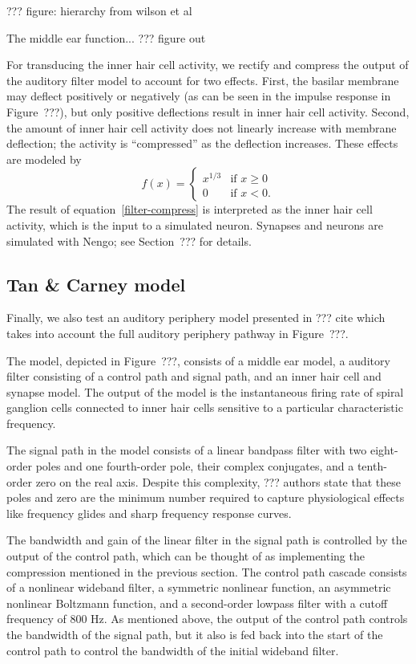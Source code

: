 ??? figure: hierarchy from wilson et al

The middle ear function...
??? figure out

For transducing the inner hair cell activity,
we rectify and compress the output
of the auditory filter model
to account for two effects.
First, the basilar membrane may deflect
positively or negatively
(as can be seen in the impulse response
in Figure~???),
but only positive deflections result in
inner hair cell activity.
Second, the amount of inner hair cell activity
does not linearly increase with
membrane deflection;
the activity is ``compressed''
as the deflection increases.
These effects are modeled by
\begin{equation} \label{filter-compress}
  f(x) =
  \begin{cases}
    x^{1 / 3} &\text{if } x \ge 0 \\
    0 &\text{if } x < 0.
  \end{cases}
\end{equation}
The result of equation~\eqref{filter-compress}
is interpreted as the inner hair cell activity,
which is the input to a simulated neuron.
Synapses and neurons are simulated with Nengo;
see Section~??? for details.

\subsection{Tan \& Carney model}

Finally, we also test
an auditory periphery model
presented in ??? cite
which takes into account
the full auditory periphery pathway
in Figure~???.

The model, depicted in Figure~???,
consists of a middle ear model,
a auditory filter consisting
of a control path and signal path,
and an inner hair cell
and synapse model.
The output of the model
is the instantaneous firing rate
of spiral ganglion cells
connected to inner hair cells
sensitive to a particular
characteristic frequency.

The signal path in the model
consists of a linear bandpass filter
with two eight-order poles
and one fourth-order pole,
their complex conjugates,
and a tenth-order zero
on the real axis.
Despite this complexity,
??? authors
state that these poles and zero
are the minimum number required
to capture physiological effects
like frequency glides
and sharp frequency response curves.


The bandwidth and gain of the linear filter
in the signal path is controlled
by the output of the control path,
which can be thought of as
implementing the compression
mentioned in the previous section.
The control path cascade consists of
a nonlinear wideband filter,
a symmetric nonlinear function,
an asymmetric nonlinear Boltzmann function,
and a second-order lowpass filter
with a cutoff frequency of 800 Hz.
As mentioned above,
the output of the control path
controls the bandwidth
of the signal path,
but it also is fed back
into the start of the control path
to control the bandwidth of the initial
wideband filter.

